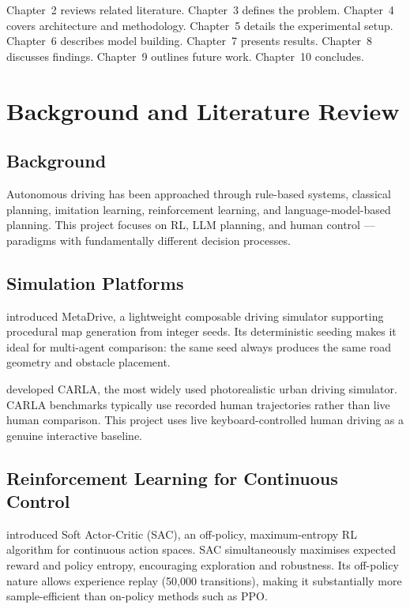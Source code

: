 \documentclass[12pt,a4paper]{report}
\begin{document}
Chapter~2 reviews related literature. Chapter~3 defines the problem. Chapter~4 covers architecture and methodology. Chapter~5 details the experimental setup. Chapter~6 describes model building. Chapter~7 presents results. Chapter~8 discusses findings. Chapter~9 outlines future work. Chapter~10 concludes.

\chapter{Background and Literature Review}

\section{Background}

Autonomous driving has been approached through rule-based systems, classical planning, imitation learning, reinforcement learning, and language-model-based planning. This project focuses on RL, LLM planning, and human control — paradigms with fundamentally different decision processes.

\section{Simulation Platforms}

\citet{li2022metadrive} introduced MetaDrive, a lightweight composable driving simulator supporting procedural map generation from integer seeds. Its deterministic seeding makes it ideal for multi-agent comparison: the same seed always produces the same road geometry and obstacle placement.

\citet{dosovitskiy2017carla} developed CARLA, the most widely used photorealistic urban driving simulator. CARLA benchmarks typically use recorded human trajectories rather than live human comparison. This project uses live keyboard-controlled human driving as a genuine interactive baseline.

\section{Reinforcement Learning for Continuous Control}

\citet{haarnoja2018sac} introduced Soft Actor-Critic (SAC), an off-policy, maximum-entropy RL algorithm for continuous action spaces. SAC simultaneously maximises expected reward and policy entropy, encouraging exploration and robustness. Its off-policy nature allows experience replay (50,000 transitions), making it substantially more sample-efficient than on-policy methods such as PPO.
\end{document}
